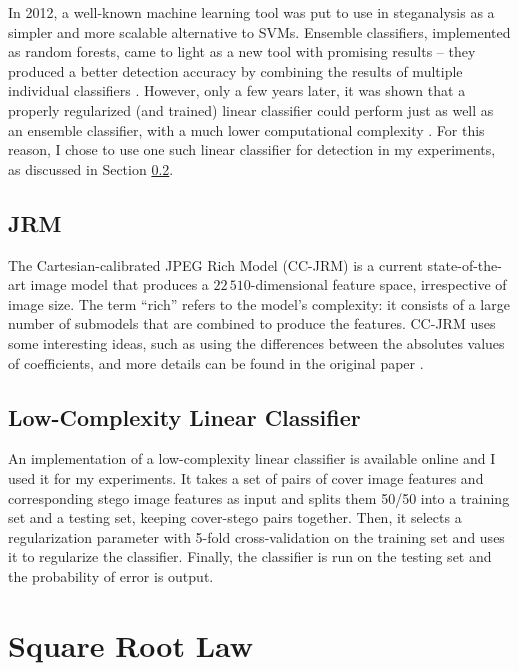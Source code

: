 \documentclass[11pt,a4paper,twoside,openright]{report}
\begin{document}
In 2012, a well-known machine learning tool was put to use in steganalysis as a simpler and more scalable alternative to SVMs. Ensemble classifiers, implemented as random forests, came to light as a new tool with promising results -- they produced a better detection accuracy by combining the results of multiple individual classifiers \cite{ensemble-classifier}. However, only a few years later, it was shown that a properly regularized (and trained) linear classifier could perform just as well as an ensemble classifier, with a much lower computational complexity \cite{classifier-paper}. For this reason, I chose to use one such linear classifier for detection in my experiments, as discussed in Section \ref{sec:classifier-background}.


\subsection{JRM} \label{sec:jrm}

The Cartesian-calibrated JPEG Rich Model (CC-JRM) is a current state-of-the-art image model that produces a $22\,510$-dimensional feature space, irrespective of image size. The term ``rich'' refers to the model's complexity: it consists of a large number of submodels that are combined to produce the features. CC-JRM uses some interesting ideas, such as using the differences between the absolutes values of coefficients, and more details can be found in the original paper \cite{jrm-paper}.


\subsection{Low-Complexity Linear Classifier} \label{sec:classifier-background}

An implementation of a low-complexity linear classifier is available online \cite{binghamton-classifier} and I used it for my experiments. It takes a set of pairs of cover image features and corresponding stego image features as input and splits them 50/50 into a training set and a testing set, keeping cover-stego pairs together. Then, it selects a regularization parameter with 5-fold cross-validation on the training set and uses it to regularize the classifier. Finally, the classifier is run on the testing set and the probability of error is output.


\section{Square Root Law}
\end{document}
